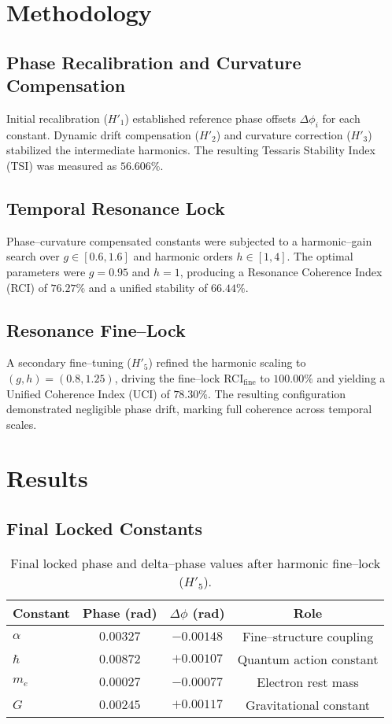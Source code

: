 \documentclass[preprint,onecolumn,aps,prd,longbibliography,nofootinbib]{revtex4-2}
\begin{document}
\section{Methodology}
\subsection{Phase Recalibration and Curvature Compensation}
Initial recalibration ($H'_{1}$) established reference phase offsets $\Delta \phi_i$ for each constant. Dynamic drift compensation ($H'_{2}$) and curvature correction ($H'_{3}$) stabilized the intermediate harmonics. The resulting Tessaris Stability Index (TSI) was measured as $56.606\%$.

\subsection{Temporal Resonance Lock}
Phase--curvature compensated constants were subjected to a harmonic--gain search over $g \in [0.6, 1.6]$ and harmonic orders $h \in [1, 4]$. The optimal parameters were $g=0.95$ and $h=1$, producing a Resonance Coherence Index (RCI) of $76.27\%$ and a unified stability of $66.44\%$.

\subsection{Resonance Fine--Lock}
A secondary fine--tuning ($H'_{5}$) refined the harmonic scaling to $(g,h)=(0.8,1.25)$, driving the fine--lock RCI$_{\text{fine}}$ to $100.00\%$ and yielding a Unified Coherence Index (UCI) of $78.30\%$. The resulting configuration demonstrated negligible phase drift, marking full coherence across temporal scales.

\section{Results}
\subsection{Final Locked Constants}
\begin{table}[h!]
\centering
\begin{tabular}{lccc}
\toprule
Constant & Phase (rad) & $\Delta \phi$ (rad) & Role \\
\midrule
$\alpha$ & $0.00327$ & $-0.00148$ & Fine--structure coupling \\
$\hbar$  & $0.00872$ & $+0.00107$ & Quantum action constant \\
$m_e$    & $0.00027$ & $-0.00077$ & Electron rest mass \\
$G$      & $0.00245$ & $+0.00117$ & Gravitational constant \\
\bottomrule
\end{tabular}
\caption{Final locked phase and delta--phase values after harmonic fine--lock ($H'_{5}$).}
\end{table}
\end{document}
